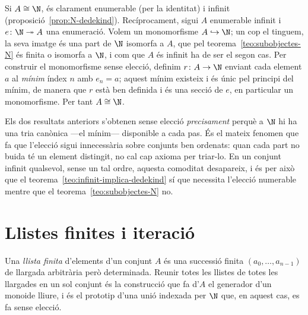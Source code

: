 \begin{prova}
Si \(A\cong\N\), és clarament enumerable (per la identitat) i infinit
(proposició~\ref{prop:N-dedekind}). Recíprocament, sigui \(A\) enumerable
infinit i \(e\colon\N\twoheadrightarrow A\) una enumeració. Volem un
monomorfisme \(A\hookrightarrow\N\); un cop el tinguem, la seva imatge és
una part de \(\N\) isomorfa a \(A\), que pel teorema~\ref{teo:subobjectes-N}
és finita o isomorfa a \(\N\), i com que \(A\) és infinit ha de ser el
segon cas. Per construir el monomorfisme sense elecció, definim
\(r\colon A\to\N\) enviant cada element \(a\) al \emph{mínim} índex \(n\)
amb \(e_n=a\); aquest mínim existeix i és únic pel principi del mínim, de
manera que \(r\) està ben definida i és una secció de \(e\), en particular
un monomorfisme. Per tant \(A\cong\N\).
\end{prova}

\begin{observacio}\label{obs:minim-vs-eleccio}
Els dos resultats anteriors s'obtenen sense elecció \emph{precisament}
perquè a \(\N\) hi ha una tria canònica ---el mínim--- disponible a cada
pas. És el mateix fenomen que fa que l'elecció sigui innecessària sobre
conjunts ben ordenats: quan cada part no buida té un element distingit, no
cal cap axioma per triar-lo. En un conjunt infinit qualsevol, sense un tal
ordre, aquesta comoditat desapareix, i és per això que el
teorema~\ref{teo:infinit-implica-dedekind} sí que necessita l'elecció
numerable mentre que el teorema~\ref{teo:subobjectes-N} no.
\end{observacio}

\section{Llistes finites i iteració}\label{sec:llistes}

Una \emph{llista finita} d'elements d'un conjunt \(A\) és una successió
finita \((a_0,\dots,a_{n-1})\) de llargada arbitrària però determinada.
Reunir totes les llistes de totes les llargades en un sol conjunt és la
construcció que fa d'\(A\) el generador d'un monoide lliure, i és el
prototip d'una unió indexada per \(\N\) que, en aquest cas, es fa sense
elecció.

